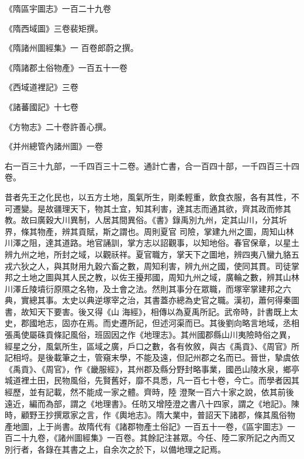 \begin{pinyinscope}
 《隋區宇圖志》一百二十九卷



 《隋西域圖》三卷裴矩撰。



 《隋諸州圖經集》一
 百卷郎蔚之撰。



 《隋諸郡土俗物產》一百五十一卷



 《西域道裡記》三卷



 《諸蕃國記》十七卷



 《方物志》二十卷許善心撰。



 《并州總管內諸州圖》一卷



 右一百三十九部，一千四百三十二卷。通計亡書，合一百四十部，一千四百三十四卷。



 昔者先王之化民也，以五方土地，風氣所生，剛柔輕重，飲食衣服，各有其性，不可遷變。是故疆理天下，物其土宜，知其利害，達其志而通其欲，齊其政而修其教。故曰廣穀大川異制，人居其間異俗。《書》錄禹別九州，定其山川，分其圻界，條其物產，辨其貢賦，斯之謂也。周則夏官
 司險，掌建九州之圖，周知山林川澤之阻，達其道路。地官誦訓，掌方志以詔觀事，以知地俗。春官保章，以星土辨九州之地，所封之域，以觀祅祥。夏官職方，掌天下之圖地，辨四夷八蠻九貉五戎六狄之人，與其財用九穀六畜之數，周知利害，辨九州之國，使同其貫。司徒掌邦之土地之圖與其人民之教，以佐王擾邦國，周知九州之域，廣輪之數，辨其山林川澤丘陵墳衍原隰之名物，及土會之法。然則其事分在眾職，而塚宰掌建邦之六典，實總其事。太史以典逆塚宰之治，其書蓋亦總為史官之職。漢初，蕭何得秦圖書，故知天下要害。後又得《山
 海經》，相傳以為夏禹所記。武帝時，計書既上太史，郡國地志，固亦在焉。而史遷所記，但述河渠而已。其後劉向略言地域，丞相張禹使屬硃貢條記風俗，班固因之作《地理志》。其州國郡縣山川夷險時俗之異，經星之分，風氣所生，區域之廣，戶口之數，各有攸敘，與古《禹貢》、《周官》所記相埒。是後載筆之士，管窺末學，不能及遠，但記州郡之名而已。晉世，摯虞依《禹貢》、《周官》，作《畿服經》，其州郡及縣分野封略事業，國邑山陵水泉，鄉亭城道裡土田，民物風俗，先賢舊好，靡不具悉，凡一百七十卷，今亡。而學者因其經歷，並有記載，然不能成一家之體。齊時，陸
 澄聚一百六十家之說，依其前後遠近，編而為部，謂之《地理書》。任昉又增陸澄之書八十四家，謂之《地記》。陳時，顧野王抄撰眾家之言，作《輿地志》。隋大業中，普詔天下諸郡，條其風俗物產地圖，上于尚書。故隋代有《諸郡物產土俗記》一百五十一卷，《區宇圖志》一百二十九卷，《諸州圖經集》一百卷。其餘記注甚眾。今任、陸二家所記之內而又別行者，各錄在其書之上，自余次之於下，以備地理之記焉。




\end{pinyinscope}
